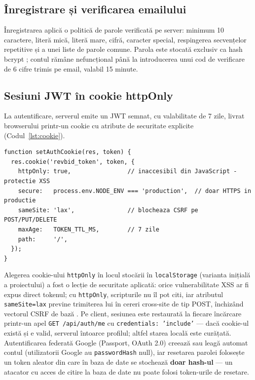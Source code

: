 \subsection{Înregistrare și verificarea emailului}

Înregistrarea aplică o politică de parole verificată pe server: minimum 10 caractere, literă mică, literă mare, cifră, caracter special, respingerea secvențelor repetitive și a unei liste de parole comune. Parola este stocată exclusiv ca hash bcrypt \cite{provos1999}; contul rămâne nefuncțional până la introducerea unui cod de verificare de 6 cifre trimis pe email, valabil 15 minute.

\subsection{Sesiuni JWT în cookie httpOnly}

La autentificare, serverul emite un JWT \cite{rfc7519} semnat, cu valabilitate de 7 zile, livrat browserului printr-un cookie cu atribute de securitate explicite (Codul~\ref{lst:cookie}).

\begin{lstlisting}[caption={Setarea cookie-ului de sesiune (server/routes/auth.js)},label={lst:cookie}]
function setAuthCookie(res, token) {
  res.cookie('revbid_token', token, {
    httpOnly: true,                // inaccesibil din JavaScript - protectie XSS
    secure:   process.env.NODE_ENV === 'production',  // doar HTTPS in productie
    sameSite: 'lax',               // blocheaza CSRF pe POST/PUT/DELETE
    maxAge:   TOKEN_TTL_MS,        // 7 zile
    path:     '/',
  });
}
\end{lstlisting}

Alegerea cookie-ului \texttt{httpOnly} în locul stocării în \texttt{localStorage} (varianta inițială a proiectului) a fost o lecție de securitate aplicată: orice vulnerabilitate XSS ar fi expus direct tokenul; cu \texttt{httpOnly}, scripturile nu îl pot citi, iar atributul \texttt{sameSite=lax} previne trimiterea lui în cereri cross-site de tip POST, închizând vectorul CSRF de bază \cite{owasp2021}. Pe client, sesiunea este restaurată la fiecare încărcare printr-un apel \texttt{GET /api/auth/me} cu \texttt{credentials: 'include'} --- dacă cookie-ul există și e valid, serverul întoarce profilul; altfel starea locală este curățată. Autentificarea federată Google (Passport, OAuth 2.0) creează sau leagă automat contul (utilizatorii Google au \texttt{passwordHash} null), iar resetarea parolei folosește un token aleator din care în baza de date se stochează \textbf{doar hash-ul} --- un atacator cu acces de citire la baza de date nu poate folosi token-urile de resetare.

